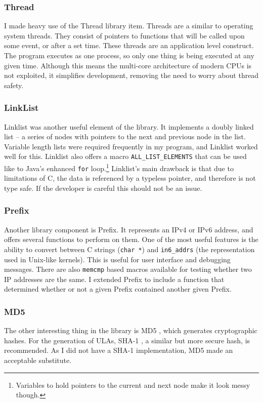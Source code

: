 \documentclass[12pt,a4paper,twoside]{report}
\begin{document}
\subsubsection{Thread}
I made heavy use of the Thread library item. Threads are a similar to operating
system threads. They consist of pointers to functions that will be called upon
some event, or after a set time. These threads are an application level
construct. The program  executes as one process, so only one thing is being
executed at any given time. Although this means the multi-core architecture of
modern CPUs is not exploited, it simplifies development, removing the need to
worry about thread safety.

\subsubsection{LinkList}
Linklist was another useful element of the library. It implements a doubly
linked list -- a series of nodes with pointers to the next and previous node in
the list.  Variable length lists were required frequently in my program, and
Linklist worked well for this. Linklist also offers a macro
\texttt{ALL\_LIST\_ELEMENTS} that can be used like to Java's enhanced
\texttt{for} loop.\footnote{Variables to hold pointers to the current and next
node make it look messy though.} Linklist's main drawback is that due to
limitations of C, the data is referenced by a typeless pointer, and therefore
is not type safe. If the developer is careful this should not be an issue. 

\subsubsection{Prefix}
Another library component is Prefix. It represents an IPv4 or IPv6 address, and
offers several functions to perform on them. One of the most useful features is
the ability to convert between C strings (\texttt{char *}) and
\texttt{in6\_addrs} (the representation used in Unix-like kernels). This is
useful for user interface and debugging messages.  There are also
\texttt{memcmp} based macros available for testing whether two IP addresses are
the same. I extended Prefix to include a function that determined whether or
not a given Prefix contained another given Prefix.

\subsubsection{MD5}
The other interesting thing in the library is MD5
, which generates cryptographic
hashes. For the generation of ULAs, SHA-1 , a similar but more secure hash, is recommended. As I did not have
a SHA-1 implementation, MD5 made an acceptable substitute. 
\end{document}
